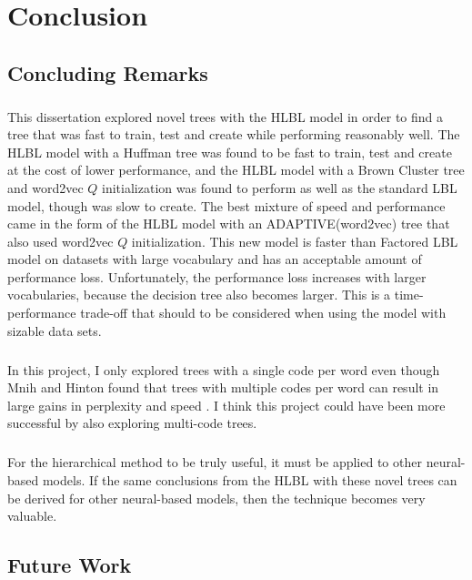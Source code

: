 
\chapter{Conclusion}

\section{Concluding Remarks}
\paragraph{}
This dissertation explored novel trees with the HLBL model in order to find a tree that was fast to train, test and create while performing reasonably well. The HLBL model with a Huffman tree was found to be fast to train, test and create at the cost of lower performance, and the HLBL model with a Brown Cluster tree and word2vec $Q$ initialization was found to perform as well as the standard LBL model, though was slow to create. The best mixture of speed and performance came in the form of the HLBL model with an ADAPTIVE(word2vec) tree that also used word2vec $Q$ initialization. This new model is faster than Factored LBL model on datasets with large vocabulary and has an acceptable amount of performance loss. Unfortunately, the performance loss increases with larger vocabularies, because the decision tree also becomes larger. This is a time-performance trade-off that should to be considered when using the model with sizable data sets. 

\paragraph{}
In this project, I only explored trees with a single code per word even though Mnih and Hinton found that trees with multiple codes per word can result in large gains in perplexity and speed \cite{MnihHinton2009}. I think this project could have been more successful by also exploring multi-code trees.

\paragraph{}
For the hierarchical method to be truly useful, it must be applied to other neural-based models. If the same conclusions from the HLBL with these novel trees can be derived for other neural-based models, then the technique becomes very valuable.

\section{Future Work}
